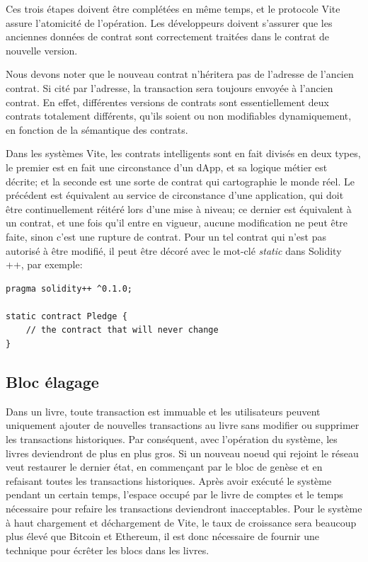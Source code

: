 \documentclass[UTF8,nofonts]{article}
\begin{document}
\begin{multicols}{2}
Ces trois étapes doivent être complétées en même temps, et le protocole Vite assure l'atomicité de l'opération. Les développeurs doivent s'assurer que les anciennes données de contrat sont correctement traitées dans le contrat de nouvelle version.

Nous devons noter que le nouveau contrat n'héritera pas de l'adresse de l'ancien contrat. Si cité par l'adresse, la transaction sera toujours envoyée à l'ancien contrat. En effet, différentes versions de contrats sont essentiellement deux contrats totalement différents, qu'ils soient ou non modifiables dynamiquement, en fonction de la sémantique des contrats.

Dans les systèmes Vite, les contrats intelligents sont en fait divisés en deux types, le premier est en fait une circonstance d'un dApp, et sa logique métier est décrite; et la seconde est une sorte de contrat qui cartographie le monde réel. Le précédent est équivalent au service de circonstance d'une application, qui doit être continuellement réitéré lors d'une mise à niveau; ce dernier est équivalent à un contrat, et une fois qu'il entre en vigueur, aucune modification ne peut être faite, sinon c'est une rupture de contrat. Pour un tel contrat qui n'est pas autorisé à être modifié, il peut être décoré avec le mot-clé \textit{static} dans Solidity ++, par exemple:

\begin{verbatim}
pragma solidity++ ^0.1.0;

static contract Pledge {
    // the contract that will never change
}
\end{verbatim}

\subsection{Bloc élagage}
Dans un livre, toute transaction est immuable et les utilisateurs peuvent uniquement ajouter de nouvelles transactions au livre sans modifier ou supprimer les transactions historiques. Par conséquent, avec l'opération du système, les livres deviendront de plus en plus gros. Si un nouveau noeud qui rejoint le réseau veut restaurer le dernier état, en commençant par le bloc de genèse et en refaisant toutes les transactions historiques. Après avoir exécuté le système pendant un certain temps, l'espace occupé par le livre de comptes et le temps nécessaire pour refaire les transactions deviendront inacceptables. Pour le système à haut chargement et déchargement de Vite, le taux de croissance sera beaucoup plus élevé que Bitcoin et Ethereum, il est donc nécessaire de fournir une technique pour écrêter les blocs dans les livres.


\end{multicols}
\end{document}
